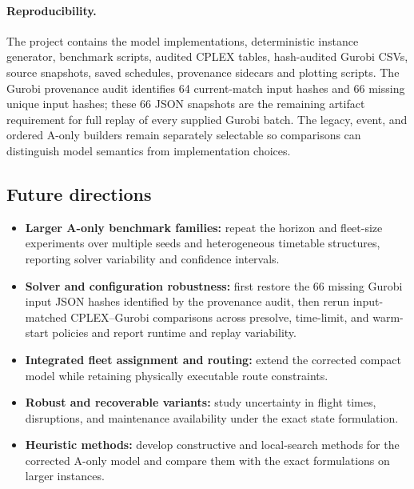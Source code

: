 \paragraph{Reproducibility.}
The project contains the model implementations, deterministic instance
generator, benchmark scripts, audited CPLEX tables, hash-audited Gurobi CSVs,
source snapshots, saved schedules, provenance sidecars and plotting scripts.
The Gurobi provenance audit identifies 64 current-match input hashes and 66
missing unique input hashes; these 66 JSON snapshots are the remaining artifact
requirement for full replay of every supplied Gurobi batch. The legacy, event, and
ordered A-only builders remain separately selectable so comparisons can
distinguish model semantics from implementation choices.

\subsection*{Future directions}

\begin{itemize}
  \item \textbf{Larger A-only benchmark families:} repeat the horizon and
    fleet-size experiments over multiple seeds and heterogeneous timetable
    structures, reporting solver variability and confidence intervals.
  \item \textbf{Solver and configuration robustness:} first restore the 66
    missing Gurobi input JSON hashes identified by the provenance audit, then
    rerun input-matched CPLEX--Gurobi comparisons across presolve, time-limit,
    and warm-start policies and report runtime and replay variability.
  \item \textbf{Integrated fleet assignment and routing:} extend the corrected
    compact model while retaining physically executable route constraints.
  \item \textbf{Robust and recoverable variants:} study uncertainty in flight
    times, disruptions, and maintenance availability under the exact state
    formulation.
  \item \textbf{Heuristic methods:} develop constructive and local-search
    methods for the corrected A-only model and compare them with the exact
    formulations on larger instances.
\end{itemize}
